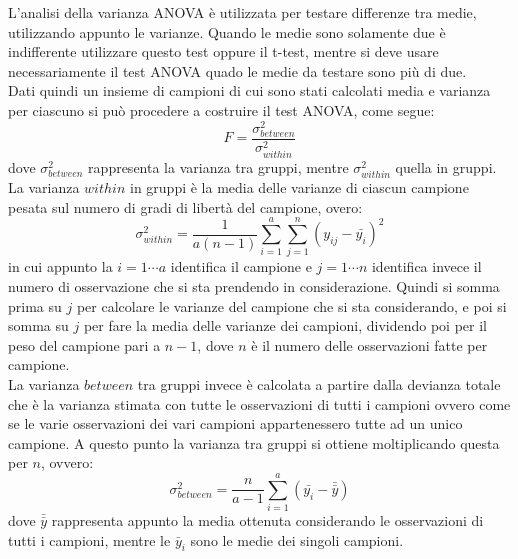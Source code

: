 \documentclass[]{article}
\begin{document}
\begin{tcolorbox}[colback=cyan!5!white, colframe=cyan!75!black, title = ANOVA]
	L'analisi della varianza ANOVA è utilizzata per testare differenze tra medie, utilizzando appunto le varianze. Quando le medie sono solamente due è indifferente utilizzare questo test oppure il t-test, mentre si deve usare necessariamente il test ANOVA quado le medie da testare sono più di due.\\
	Dati quindi un insieme di campioni di cui sono stati calcolati media e varianza per ciascuno si può procedere a costruire il test ANOVA, come segue:
	\begin{equation}
	F = \frac{\sigma^2_{between}}{\sigma^2_{within}}
	\label{eq: test ANOVA}
	\end{equation}
	dove $\sigma^2_{between}$ rappresenta la varianza tra gruppi, mentre $\sigma^2_{within}$ quella in gruppi.\\
	La varianza $within$ in gruppi è la media delle varianze di ciascun campione pesata sul numero di gradi di libertà del campione, overo:
	\begin{equation}
	\sigma^2_{within} = \frac{1}{a(n-1)}\sum_{i=1}^{a}\sum_{j=1}^{n}(y_{ij} - \bar{y_i})^2
	\end{equation}
	in cui appunto la $i = 1 \cdots a$ identifica il campione e $j = 1 \cdots n$ identifica invece il numero di osservazione che si sta prendendo in considerazione. Quindi si somma prima su $j$ per calcolare le varianze del campione che si sta considerando, e poi si somma su $j$ per fare la media delle varianze dei campioni, dividendo poi per il peso del campione pari a $n-1$, dove $n$ è il numero delle osservazioni fatte per campione. \\
	La varianza $between$ tra gruppi invece è calcolata a partire dalla devianza totale che è la varianza stimata con tutte le osservazioni di tutti i campioni ovvero come se le varie osservazioni dei vari campioni appartenessero tutte ad un unico campione. A questo punto la varianza tra gruppi si ottiene moltiplicando questa per $n$, ovvero:
	\begin{equation}
	\sigma^2_{between} = \frac{n}{a-1}\sum_{i=1}^{a} (\bar{y_i} - \bar{\bar{y}})
	\end{equation}
	dove $\bar{\bar{y}}$ rappresenta appunto la media ottenuta considerando le osservazioni di tutti i campioni, mentre le $\bar{y}_i$ sono le medie dei singoli campioni.
	

\end{tcolorbox}
\end{document}
